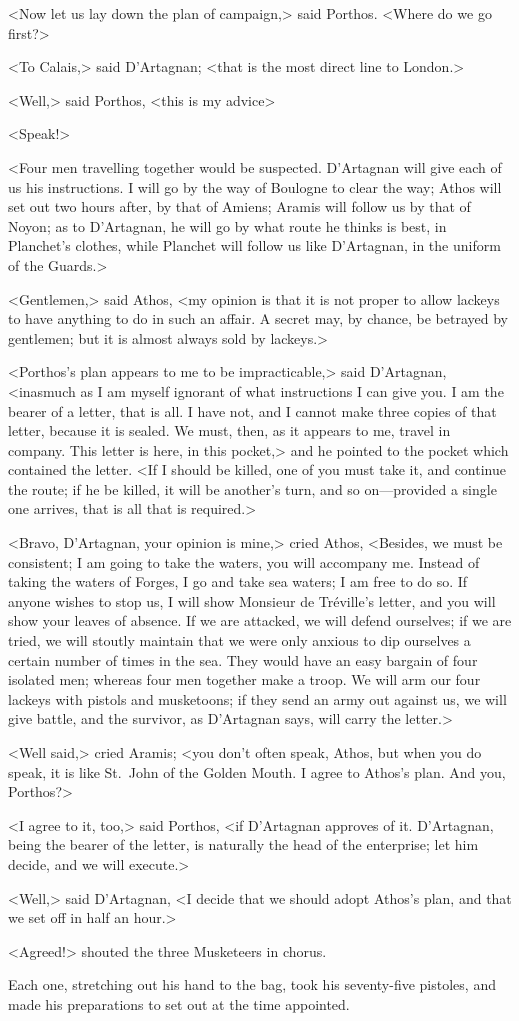 <Now let us lay down the plan of campaign,> said Porthos. <Where do we go first?> 

<To Calais,> said D'Artagnan; <that is the most direct line to London.> 

<Well,> said Porthos, <this is my advice\longdash> 

<Speak!> 

<Four men travelling together would be suspected. D'Artagnan will give each of us his instructions. I will go by the way of Boulogne to clear the way; Athos will set out two hours after, by that of Amiens; Aramis will follow us by that of Noyon; as to D'Artagnan, he will go by what route he thinks is best, in Planchet's clothes, while Planchet will follow us like D'Artagnan, in the uniform of the Guards.> 

<Gentlemen,> said Athos, <my opinion is that it is not proper to allow lackeys to have anything to do in such an affair. A secret may, by chance, be betrayed by gentlemen; but it is almost always sold by lackeys.> 

<Porthos's plan appears to me to be impracticable,> said D'Artagnan, <inasmuch as I am myself ignorant of what instructions I can give you. I am the bearer of a letter, that is all. I have not, and I cannot make three copies of that letter, because it is sealed. We must, then, as it appears to me, travel in company. This letter is here, in this pocket,> and he pointed to the pocket which contained the letter. <If I should be killed, one of you must take it, and continue the route; if he be killed, it will be another's turn, and so on—provided a single one arrives, that is all that is required.> 

<Bravo, D'Artagnan, your opinion is mine,> cried Athos, <Besides, we must be consistent; I am going to take the waters, you will accompany me. Instead of taking the waters of Forges, I go and take sea waters; I am free to do so. If anyone wishes to stop us, I will show Monsieur de Tréville's letter, and you will show your leaves of absence. If we are attacked, we will defend ourselves; if we are tried, we will stoutly maintain that we were only anxious to dip ourselves a certain number of times in the sea. They would have an easy bargain of four isolated men; whereas four men together make a troop. We will arm our four lackeys with pistols and musketoons; if they send an army out against us, we will give battle, and the survivor, as D'Artagnan says, will carry the letter.> 

<Well said,> cried Aramis; <you don't often speak, Athos, but when you do speak, it is like St.~John of the Golden Mouth. I agree to Athos's plan. And you, Porthos?> 

<I agree to it, too,> said Porthos, <if D'Artagnan approves of it. D'Artagnan, being the bearer of the letter, is naturally the head of the enterprise; let him decide, and we will execute.> 

<Well,> said D'Artagnan, <I decide that we should adopt Athos's plan, and that we set off in half an hour.> 

<Agreed!> shouted the three Musketeers in chorus. 

Each one, stretching out his hand to the bag, took his seventy-five pistoles, and made his preparations to set out at the time appointed. 